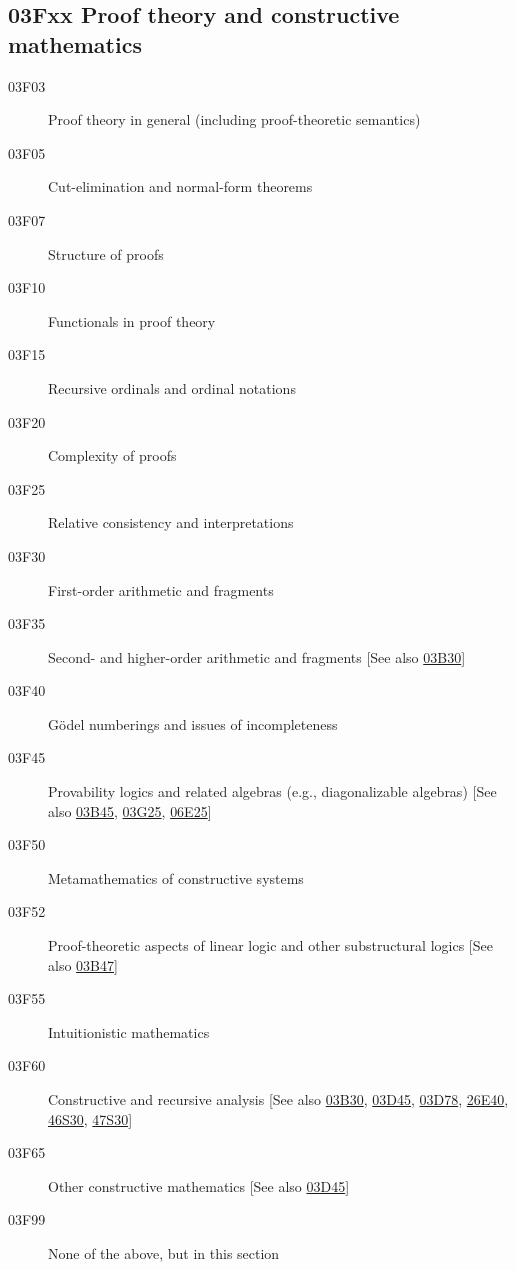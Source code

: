\documentclass[letterpaper]{article}
\begin{document}
\subsection*{03Fxx  Proof theory and constructive mathematics }\label{03Fxx}
\begin{description}
\item [03F03]\label{03F03} Proof theory in general (including proof-theoretic semantics)
\item [03F05]\label{03F05} Cut-elimination and normal-form theorems
\item [03F07]\label{03F07} Structure of proofs
\item [03F10]\label{03F10} Functionals in proof theory
\item [03F15]\label{03F15} Recursive ordinals and ordinal notations
\item [03F20]\label{03F20} Complexity of proofs
\item [03F25]\label{03F25} Relative consistency and interpretations
\item [03F30]\label{03F30} First-order arithmetic and fragments
\item [03F35]\label{03F35} Second- and higher-order arithmetic and fragments [See also \hyperref[03B30]{03B30}]
\item [03F40]\label{03F40} G\"{o}del numberings and issues of incompleteness
\item [03F45]\label{03F45} Provability logics and related algebras (e.g., diagonalizable algebras) [See also \hyperref[03B45]{03B45}, \hyperref[03G25]{03G25}, \hyperref[06E25]{06E25}]
\item [03F50]\label{03F50} Metamathematics of constructive systems
\item [03F52]\label{03F52} Proof-theoretic aspects of linear logic and other substructural logics [See also \hyperref[03B47]{03B47}]
\item [03F55]\label{03F55} Intuitionistic mathematics
\item [03F60]\label{03F60} Constructive and recursive analysis [See also \hyperref[03B30]{03B30}, \hyperref[03D45]{03D45}, \hyperref[03D78]{03D78}, \hyperref[26E40]{26E40}, \hyperref[46S30]{46S30}, \hyperref[47S30]{47S30}]
\item [03F65]\label{03F65} Other constructive mathematics [See also \hyperref[03D45]{03D45}]
\item [03F99]\label{03F99} None of the above, but in this section
\end{description}
\end{document}
